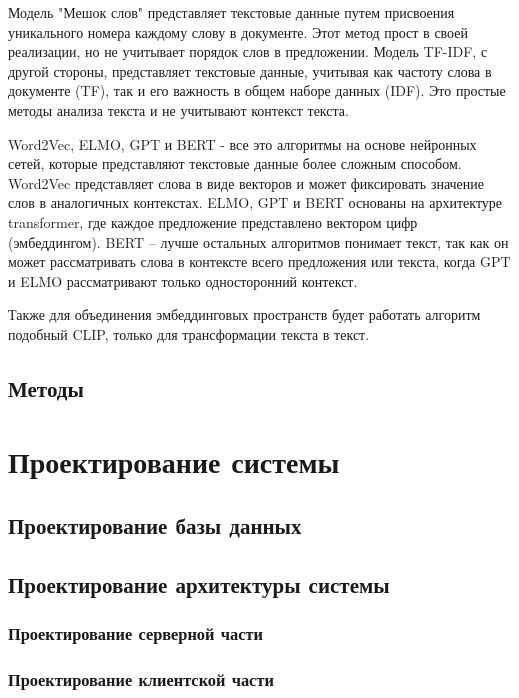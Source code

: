 \documentclass[PI, VKR]{HSEUniversity}
\begin{document}
Модель "Мешок слов" представляет текстовые данные путем присвоения уникального номера каждому слову в документе. Этот метод прост в своей реализации, но не учитывает порядок слов в предложении. Модель TF-IDF, с другой стороны, представляет текстовые данные, учитывая как частоту слова в документе (TF), так и его важность в общем наборе данных (IDF). Это простые методы анализа текста и не учитывают контекст текста.

Word2Vec, ELMO, GPT и BERT - все это алгоритмы на основе нейронных сетей, которые представляют текстовые данные более сложным способом. Word2Vec представляет слова в виде векторов и может фиксировать значение слов в аналогичных контекстах. ELMO, GPT и BERT основаны на архитектуре transformer, где каждое предложение представлено вектором цифр (эмбеддингом). BERT -- лучше остальных алгоритмов понимает текст, так как он может рассматривать слова в контексте всего предложения или текста, когда GPT и ELMO рассматривают только односторонний контекст.

Также для объединения эмбеддинговых пространств будет работать алгоритм подобный CLIP\autocite{radford2021learning}, только для трансформации текста в текст.
\section{Методы}
\label{sec:org44dc633}
\chapter{Проектирование системы}
\label{sec:org1ea89cd}
\section{Проектирование базы данных}
\label{sec:org8a9e004}

\section{Проектирование архитектуры системы}
\label{sec:orgf7dbda1}
\subsection{Проектирование серверной части}
\label{sec:org321ad16}
\subsection{Проектирование клиентской части}
\label{sec:orgb29b93d}
\end{document}
